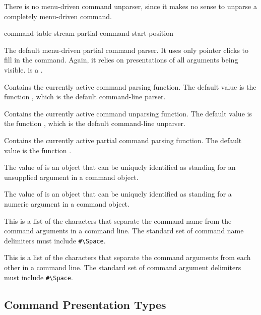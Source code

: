 There is no menu-driven command unparser, since it makes no sense to unparse a
completely menu-driven command.

       {command-table stream partial-command start-position}

The default menu-driven partial command parser.  It uses only pointer clicks to
fill in the command.  Again, it relies on presentations of all arguments being
visible.   is a .



Contains the currently active command parsing function.  The default value is
the function , which is the default command-line
parser.


Contains the currently active command unparsing function.  The default value is
the function , which is the default
command-line unparser.


Contains the currently active partial command parsing function.  The default value
is the function .


The value of  is an object that can be uniquely
identified as standing for an unsupplied argument in a command object.


The value of  is an object that can be uniquely
identified as standing for a numeric argument in a command object.


This is a list of the characters that separate the command name from the command
arguments in a command line.  The standard set of command name delimiters must
include \verb+#\Space+.


This is a list of the characters that separate the command arguments from each
other in a command line.  The standard set of command argument delimiters must
include \verb+#\Space+.


\subsection {Command Presentation Types}

